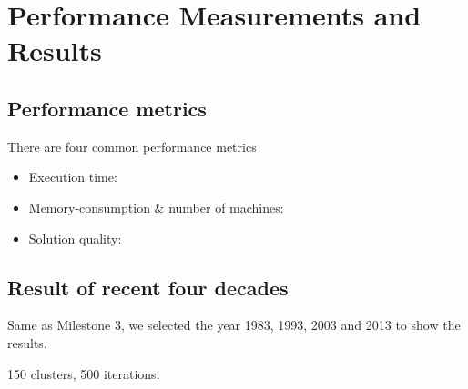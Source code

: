 \section{Performance Measurements and Results}

\subsection{Performance metrics}
There are four common performance metrics 
\begin{itemize}
    \item Execution time:
    \item Memory-consumption \& number of machines:
    \item Solution quality:
\end{itemize}

\subsection{Result of recent four decades}

Same as Milestone $3$, we selected the year 1983, 1993, 2003 and 2013 to show the results.

150 clusters, 500 iterations.


